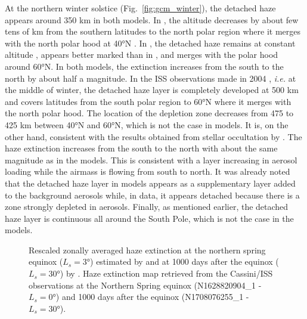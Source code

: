 At the northern winter solstice (Fig.~\ref{fig:gcm_winter}), the detached haze appears around 350 km in both models.
In \cite{Lebonnois2012}, the altitude decreases by about few tens of km from the southern latitudes to
the north polar region where it merges with the north polar hood at \ang{40}N .
In \cite{Larson2015}, the detached haze remains at constant altitude , appears better marked than in \cite{Lebonnois2012}, and merges with the polar hood around \ang{60}N.
In both models, the extinction increases from the south to the north by about half a magnitude.
In the ISS observations made in 2004 , \emph{i.e.} at the middle of winter, the detached haze layer is completely developed at 500 km and covers latitudes from the south polar region to \ang{60}N where it merges with the north polar hood.
The location of the depletion zone decreases from 475 to 425 km between \ang{40}N and \ang{60}N, which is not the case in
models. It is, on the other hand, consistent with the results obtained from stellar occultation by \cite{Sicardy2006}.
The haze extinction increases from the south to the north with about the same magnitude as in the models. This
is consistent with a layer increasing in aerosol loading while the airmass is flowing from south to north. It was already
noted \citep{West2011, West2018} that the detached haze layer in models appears as a supplementary layer added to
the background aerosols while, in data, it appears detached because there is a zone strongly depleted in
aerosols. Finally, as mentioned earlier, the detached haze layer is continuous all around the South Pole, which is not
the case in the models.

\begin{figure*}[!ht]
\caption{Rescaled zonally averaged haze extinction at the northern spring equinox ($L_s = \ang{3}$)
estimated by \cite{Lebonnois2012}  and at 1000 days after the equinox ($L_s = \ang{30}$)
by \cite{Larson2015} .
 Haze extinction map retrieved from the Cassini/ISS observations
at the Northern Spring equinox (N1628820904\_1 - $L_s = \ang{0}$)
and 1000 days after the equinox (N1708076255\_1 - $L_s = \ang{30}$).}
\label{fig:gcm_spring}
\end{figure*}

